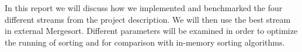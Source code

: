 In this report we will discuss how we implemented and benchmarked the four different streams from the project description. We will then use the best stream in external Mergesort. Different parameters will be examined in order to optimize the running of sorting and for comparison with in-memory sorting algorithms.